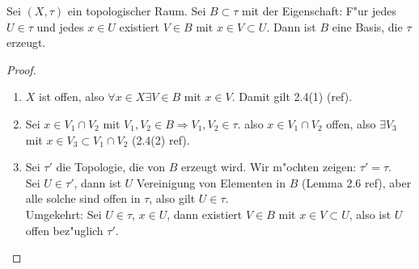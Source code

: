 \begin{lem}
    Sei $(X, \tau)$ ein topologischer Raum. Sei $B\subset \tau$ mit der Eigenschaft:
    F"ur jedes $U\in \tau$ und jedes $x\in U$ existiert $V\in B$ mit $x\in V\subset U$.
    Dann ist $B$ eine Basis, die $\tau$ erzeugt.

    \begin{proof}
        \begin{enumerate}
            \item $X$ ist offen, also $\forall x\in X \exists V\in B$ mit $x\in V$.
                Damit gilt 2.4(1) (ref).
            \item Sei $x\in V_1\cap V_2$ mit $V_1, V_2 \in B \Rightarrow V_1, V_2 \in \tau$.
                also $x\in V_1\cap V_2$ offen, also $\exists V_3$ mit
                $x\in V_3\subset V_1\cap V_2$ (2.4(2) ref).
            \item Sei $\tau'$ die Topologie, die von $B$ erzeugt wird. Wir m"ochten zeigen:
                $\tau' = \tau$.\\
                Sei $U\in\tau'$, dann ist $U$ Vereinigung von Elementen in $B$
                (Lemma 2.6 ref),
                aber alle solche sind offen in $\tau$, also gilt $U\in\tau$.\\
                Umgekehrt: Sei $U\in\tau$, $x\in U$, dann existiert $V\in B$ mit
                $x\in V\subset U$, also ist $U$ offen bez"uglich $\tau'$.
        \end{enumerate}
    \end{proof}
\end{lem}

